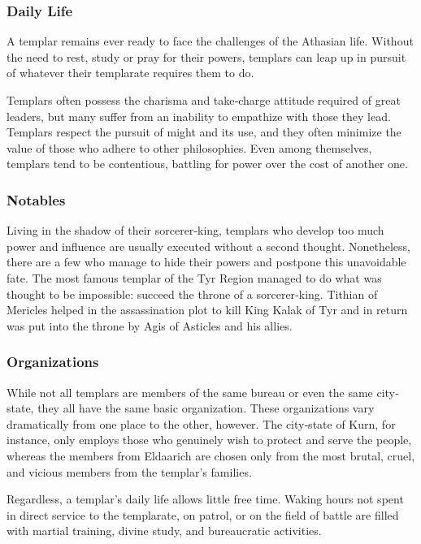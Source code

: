 \subsubsection{Daily Life}
A templar remains ever ready to face the challenges of the Athasian life. Without the need to rest, study or pray for their powers, templars can leap up in pursuit of whatever their templarate requires them to do.

Templars often possess the charisma and take‐charge attitude required of great leaders, but many suffer from an inability to empathize with those they lead. Templars respect the pursuit of might and its use, and they often minimize the value of those who adhere to other philosophies. Even among themselves, templars tend to be contentious, battling for power over the cost of another one.

\subsubsection{Notables}
Living in the shadow of their sorcerer‐king, templars who develop too much power and influence are usually executed without a second thought. Nonetheless, there are a few who manage to hide their powers and postpone this unavoidable fate. The most famous templar of the Tyr Region managed to do what was thought to be impossible: succeed the throne of a sorcerer‐king. Tithian of Mericles helped in the assassination plot to kill King Kalak of Tyr and in return was put into the throne by Agis of Asticles and his allies.

\subsubsection{Organizations}
While not all templars are members of the same bureau or even the same city‐state, they all have the same basic organization. These organizations vary dramatically from one place to the other, however. The city‐state of Kurn, for instance, only employs those who genuinely wish to protect and serve the people, whereas the members from Eldaarich are chosen only from the most brutal, cruel, and vicious members from the templar's families.

Regardless, a templar's daily life allows little free time. Waking hours not spent in direct service to the templarate, on patrol, or on the field of battle are filled with martial training, divine study, and bureaucratic
activities.

